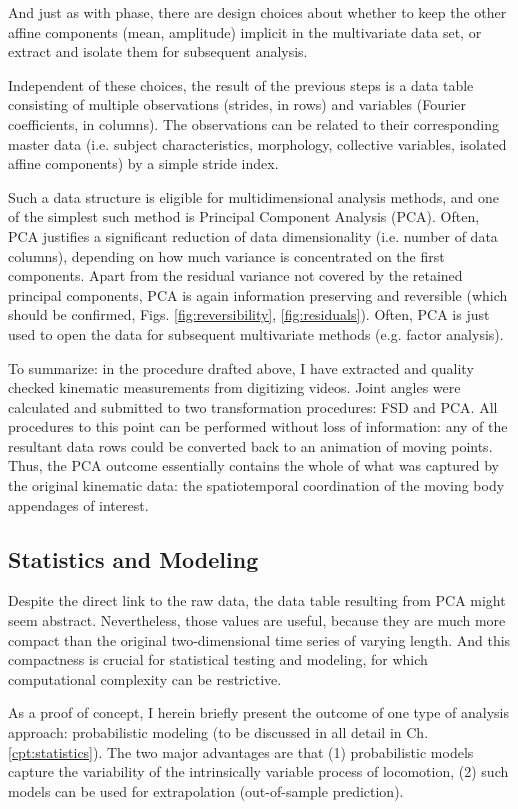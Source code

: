 And just as with phase, there are design choices about whether to keep the other affine components (mean, amplitude) implicit in the multivariate data set, or extract and isolate them for subsequent analysis.


Independent of these choices, the result of the previous steps is a data table consisting of multiple observations (strides, in rows) and variables (Fourier coefficients, in columns).
The observations can be related to their corresponding master data (i.e. subject characteristics, morphology, collective variables, isolated affine components) by a simple stride index.

Such a data structure is eligible for multidimensional analysis methods, and one of the simplest such method is Principal Component Analysis (PCA).
Often, PCA justifies a significant reduction of data dimensionality (i.e. number of data columns), depending on how much variance is concentrated on the first components.
Apart from the residual variance not covered by the retained principal components, PCA is again information preserving and reversible (which should be confirmed, Figs. \ref{fig:reversibility}, \ref{fig:residuals}).
Often, PCA is just used to open the data for subsequent multivariate methods (e.g. factor analysis).


To summarize: in the procedure drafted above, I have extracted and quality checked kinematic measurements from digitizing videos.
Joint angles were calculated and submitted to two transformation procedures: FSD and PCA.
All procedures to this point can be performed without loss of information: any of the resultant data rows could be converted back to an animation of moving points.
Thus, the PCA outcome essentially contains the whole of what was captured by the original kinematic data: the spatiotemporal coordination of the moving body appendages of interest.


\subsection{Statistics and Modeling}
\label{sec:org25fbd32}
Despite the direct link to the raw data, the data table resulting from PCA might seem abstract.
Nevertheless, those values are useful, because they are much more compact than the original two-dimensional time series of varying length.
And this compactness is crucial for statistical testing and modeling, for which computational complexity can be restrictive.


As a proof of concept, I herein briefly present the outcome of one type of analysis approach: probabilistic modeling (to be discussed in all detail in Ch. \ref{cpt:statistics}).
The two major advantages are that (1) probabilistic models capture the variability of the intrinsically variable process of locomotion, (2) such models can be used for extrapolation (out-of-sample prediction).


